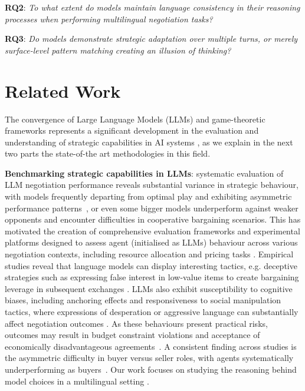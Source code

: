 \documentclass[11pt]{article}
\begin{document}
\noindent\textbf{RQ2}: \textit{To what extent do models maintain language consistency in their reasoning processes when performing multilingual negotiation tasks?}

\noindent\textbf{RQ3}: \textit{Do models demonstrate strategic adaptation over multiple turns, or merely surface-level pattern matching creating an illusion of thinking?}


\section{Related Work}

The convergence of Large Language Models (LLMs) and game-theoretic frameworks represents a significant development in the evaluation and understanding of strategic capabilities in AI systems \cite{sun2025gametheorymeetslarge}, as we explain in the next two parts the state-of-the art methodologies in this field.

\textbf{Benchmarking strategic capabilities in LLMs}: systematic evaluation of LLM negotiation performance reveals substantial variance in strategic behaviour, with models frequently departing from optimal play and exhibiting asymmetric performance patterns~\cite{DBLP:conf/iclr/DavidsonVK024, DBLP:journals/corr/abs-2411-05990,DBLP:journals/corr/abs-2305-16867, pollo2025re}, or even some bigger models underperform against weaker opponents and encounter difficulties in cooperative bargaining scenarios. This has motivated the creation of comprehensive evaluation frameworks and experimental platforms designed to assess agent (initialised as LLMs) behaviour across various negotiation contexts, including resource allocation and pricing tasks \cite{DBLP:conf/icml/0001CYTJ024, DBLP:conf/acl/Xia0RMZ0024}.
Empirical studies reveal that language models can display interesting tactics, e.g. deceptive strategies such as expressing false interest in low-value items to create bargaining leverage in subsequent exchanges \cite{lewis-etal-2017-deal}. LLMs also exhibit susceptibility to cognitive biases, including anchoring effects and responsiveness to social manipulation tactics, where expressions of desperation or aggressive language can substantially affect negotiation outcomes \cite{DBLP:conf/icml/0001CYTJ024}. As these behaviours present practical risks, outcomes may result in budget constraint violations and acceptance of economically disadvantageous agreements~\cite{DBLP:journals/corr/abs-2506-00073}. A consistent finding across studies is the asymmetric difficulty in buyer versus seller roles, with agents systematically underperforming as buyers~\cite{DBLP:conf/acl/Xia0RMZ0024}. Our work focuses on studying the reasoning behind model choices in a multilingual setting \cite{DBLP:journals/corr/abs-2502-09457}.
\end{document}

